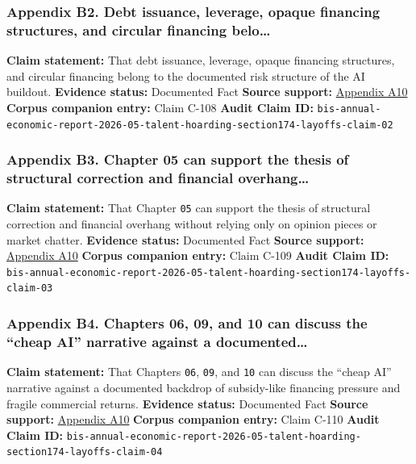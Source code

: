 \documentclass[
  american,
  11pt,
  letterpaper,
]{article}
\begin{document}
\subsubsection{Appendix B2. Debt issuance, leverage, opaque financing
structures, and circular financing
belo\ldots{}}\label{appendix-b2-debt-issuance-leverage-opaque-financing-structures-and-circular-financing-belo}

\textbf{Claim statement:} That debt issuance, leverage, opaque financing
structures, and circular financing belong to the documented risk
structure of the AI buildout. \textbf{Evidence status:} Documented Fact
\textbf{Source support:}
\hyperref[appendix-a10-annual-economic-report-2026]{Appendix A10}
\textbf{Corpus companion entry:} Claim C-108 \textbf{Audit Claim ID:}
\texttt{bis-annual-economic-report-2026-05-talent-hoarding-section174-layoffs-claim-02}

\subsubsection{Appendix B3. Chapter 05 can support the thesis of
structural correction and financial
overhang\ldots{}}\label{appendix-b3-chapter-05-can-support-the-thesis-of-structural-correction-and-financial-overhang}

\textbf{Claim statement:} That Chapter \texttt{05} can support the
thesis of structural correction and financial overhang without relying
only on opinion pieces or market chatter. \textbf{Evidence status:}
Documented Fact \textbf{Source support:}
\hyperref[appendix-a10-annual-economic-report-2026]{Appendix A10}
\textbf{Corpus companion entry:} Claim C-109 \textbf{Audit Claim ID:}
\texttt{bis-annual-economic-report-2026-05-talent-hoarding-section174-layoffs-claim-03}

\subsubsection{Appendix B4. Chapters 06, 09, and 10 can discuss the
``cheap AI'' narrative against a
documented\ldots{}}\label{appendix-b4-chapters-06-09-and-10-can-discuss-the-cheap-ai-narrative-against-a-documented}

\textbf{Claim statement:} That Chapters \texttt{06}, \texttt{09}, and
\texttt{10} can discuss the ``cheap AI'' narrative against a documented
backdrop of subsidy-like financing pressure and fragile commercial
returns. \textbf{Evidence status:} Documented Fact \textbf{Source
support:} \hyperref[appendix-a10-annual-economic-report-2026]{Appendix
A10} \textbf{Corpus companion entry:} Claim C-110 \textbf{Audit Claim
ID:}
\texttt{bis-annual-economic-report-2026-05-talent-hoarding-section174-layoffs-claim-04}
\end{document}

